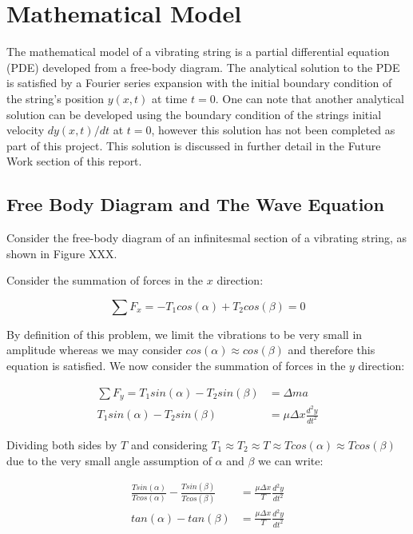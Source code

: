 \documentclass[%
 reprint,
 amsmath,amssymb,
 aps,
]{revtex4-1}
\begin{document}
\section{\label{sec:level1}Mathematical Model}
The mathematical model of a vibrating string is a partial differential equation (PDE) developed from a free-body diagram. The analytical solution to the PDE is satisfied by a Fourier series expansion with the initial boundary condition of the string's position \(y(x,t)\) at time \(t = 0\). One can note that another analytical solution can be developed using the boundary condition of the strings initial velocity \(dy(x,t)/dt\) at \(t = 0\), however this solution has not been completed as part of this project. This solution is discussed in further detail in the Future Work section of this report.



\subsection{\label{sec:level1}Free Body Diagram and The Wave Equation }

Consider the free-body diagram of an infinitesmal section of a vibrating string, as shown in Figure XXX. 

Consider the summation of forces in the $x$ direction:


\begin{equation}
\sum F_x = -T_1 cos(\alpha) + T_2 cos(\beta) = 0
\end{equation}

By definition of this problem, we limit the vibrations to be very small in amplitude whereas we may consider $cos(\alpha) \approx cos(\beta)$ and therefore this equation is satisfied. We now consider the summation of forces in the $y$ direction:

\begin{align}
\sum F_y = T_1sin(\alpha) - T_2sin(\beta) &= \Delta ma\\
T_1sin(\alpha) - T_2sin(\beta) &= \mu \Delta x \frac{d^2y}{dt^2}
\end{align}

Dividing both sides by $T$ and considering $T_1 \approx T_2 \approx T \approx Tcos(\alpha) \approx Tcos(\beta)$ due to the very small angle assumption of $\alpha$ and $\beta$ we can write:

\begin{align}
\frac{Tsin(\alpha)}{Tcos(\alpha)} - \frac{Tsin(\beta)}{Tcos(\beta)} &=  \frac{\mu \Delta x}{T} \frac{d^2y}{dt^2}\\
tan(\alpha) - tan(\beta) &=  \frac{\mu \Delta x}{T} \frac{d^2y}{dt^2}
\end{align}
\end{document}
